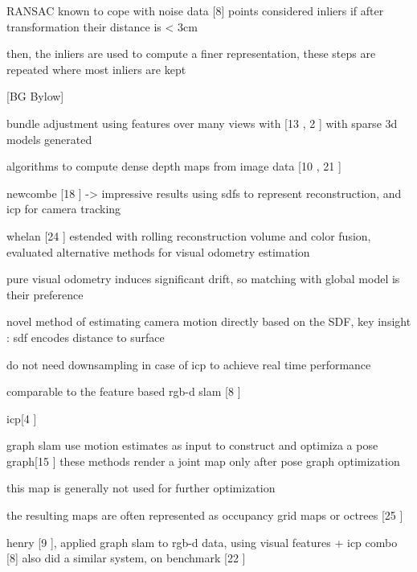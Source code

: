 RANSAC known to cope with noise data [8]
points considered inliers if after transformation their distance is < 3cm

then, the inliers are used to compute a finer representation, these steps are repeated where most inliers are kept

















[BG Bylow]

bundle adjustment using features over many views with [13 \cite{Klein07Parallel} , 2 \cite{Agarwal09Building}] with sparse 3d models generated

algorithms to compute dense depth maps from image data [10 \cite{Hirschmuller05Accurate} , 21 \cite{Stuhmer10Real}]

newcombe [18 \cite{Newcombe11Kinectfusion} ] -> impressive results using sdfs to represent reconstruction, and icp for camera tracking

whelan [24 \cite{Whelan13Robust}] estended with rolling reconstruction volume and color fusion, evaluated alternative methods for visual odometry estimation

pure visual odometry induces significant drift, so matching with global model is their preference

novel method of estimating camera motion directly based on the SDF, key insight : sdf encodes distance to surface

do not need downsampling in case of icp to achieve real time performance

comparable to the feature based rgb-d slam [8 \cite{Endres12Evaluation}]

icp[4 \cite{Besl92Method}]

graph slam use motion estimates as input to construct and optimiza a pose graph[15 \cite{Kummerle11G}] these methods render a joint map only after pose graph optimization

this map is generally not used for further optimization

the resulting maps are often represented as occupancy grid maps or octrees [25 \cite{Wurm10Octomap}]

henry [9 \cite{Henry10Rgb}], applied graph slam to rgb-d data, using visual features + icp combo [8] also did a similar system, on benchmark [22 \cite{Sturm12Benchmark}]

